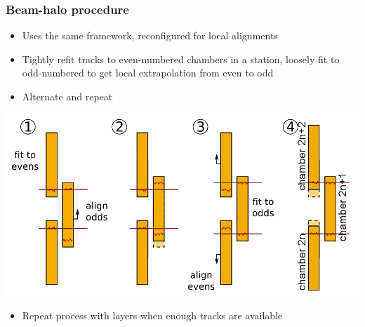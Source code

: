 \documentclass[compress]{beamer}
\begin{document}
\begin{frame}
\frametitle{Beam-halo procedure}
\begin{itemize}
\item Uses the same framework, reconfigured for local alignments
\item Tightly refit tracks to even-numbered chambers in a station,
loosely fit to odd-numbered to get local extrapolation from even to
odd
\item Alternate and repeat
\end{itemize}

\begin{center}
\includegraphics[width=0.87\linewidth]{even-odd.png}
\end{center}

\vspace{-0.25 cm}
\begin{itemize}
\item Repeat process with layers when enough tracks are available
\end{itemize}
\end{frame}
\end{document}
